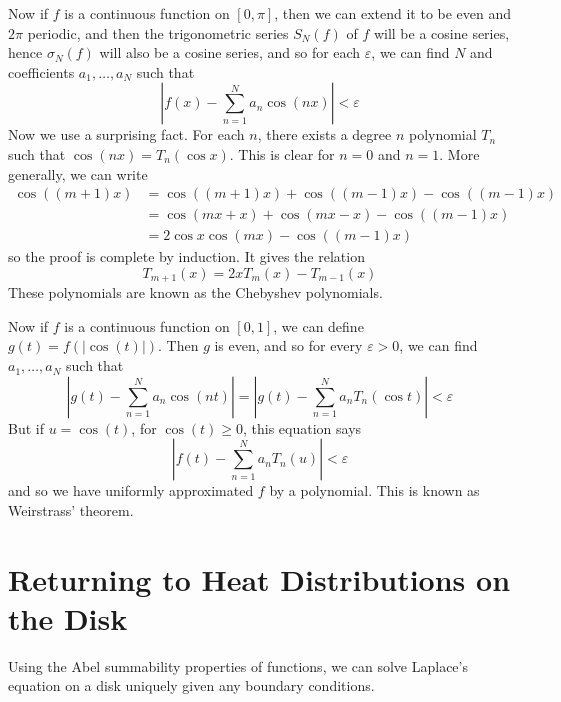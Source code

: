 Now if $f$ is a continuous function on $[0,\pi]$, then we can extend it to be even and $2\pi$ periodic, and then the trigonometric series $S_N(f)$ of $f$ will be a cosine series, hence $\sigma_N(f)$ will also be a cosine series, and so for each $\varepsilon$, we can find $N$ and coefficients $a_1, \dots, a_N$ such that
%
\[ |f(x) - \sum_{n = 1}^N a_n \cos(nx)| < \varepsilon \]
%
Now we use a surprising fact. For each $n$, there exists a degree $n$ polynomial $T_n$ such that $\cos(nx) = T_n(\cos x)$. This is clear for $n = 0$ and $n = 1$. More generally, we can write
%
\begin{align*}
	\cos((m+1)x) &= \cos((m+1)x) + \cos((m-1)x) - \cos((m-1)x)\\
	&= \cos(mx + x) + \cos(mx - x) - \cos((m-1)x)\\
	&= 2 \cos x \cos(mx) - \cos((m-1)x)
\end{align*}
%
so the proof is complete by induction. It gives the relation 
%
\[ T_{m+1}(x) = 2xT_m(x) - T_{m-1}(x) \]
%
These polynomials are known as the Chebyshev polynomials.

Now if $f$ is a continuous function on $[0,1]$, we can define $g(t) = f(|\cos(t)|)$. Then $g$ is even, and so for every $\varepsilon > 0$, we can find $a_1, \dots, a_N$ such that
%
\[ \left|g(t) - \sum_{n = 1}^N a_n \cos(nt) \right| = \left| g(t) - \sum_{n = 1}^N a_n T_n(\cos t) \right| < \varepsilon \]
%
But if $u = \cos(t)$, for $\cos(t) \geq 0$, this equation says
%
\[ \left| f(t) - \sum_{n = 1}^N a_n T_n(u) \right| < \varepsilon \]
%
and so we have uniformly approximated $f$ by a polynomial. This is known as Weirstrass' theorem.

\section{Returning to Heat Distributions on the Disk}

Using the Abel summability properties of functions, we can solve Laplace's equation on a disk uniquely given any boundary conditions.

